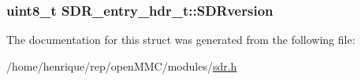 \hypertarget{structSDR__entry__hdr__t_a8d06627216139b97797973df3bbbece6}{
\subsubsection[{S\-D\-Rversion}]{\setlength{\rightskip}{0pt plus 5cm}uint8\-\_\-t S\-D\-R\-\_\-entry\-\_\-hdr\-\_\-t\-::\-S\-D\-Rversion}}\label{structSDR__entry__hdr__t_a8d06627216139b97797973df3bbbece6}


The documentation for this struct was generated from the following file\-:\begin{DoxyCompactItemize}
\item 
/home/henrique/rep/open\-M\-M\-C/modules/\hyperlink{sdr_8h}{sdr.\-h}\end{DoxyCompactItemize}
